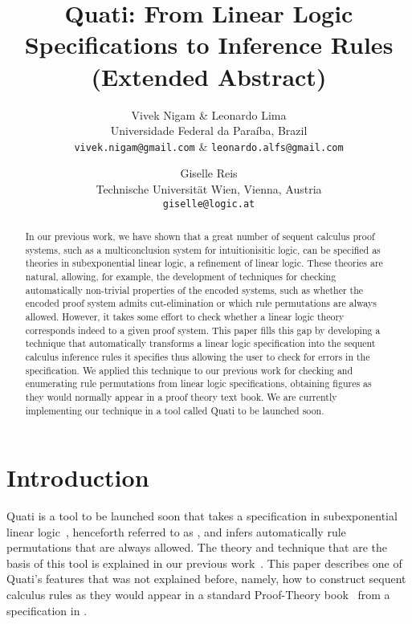 \documentclass[a4paper,10pt]{article}
\title{Quati: From Linear Logic Specifications to Inference Rules (Extended Abstract)}
\author{Vivek Nigam \& Leonardo Lima \\
Universidade Federal da Paraíba, Brazil\\
\texttt{vivek.nigam@gmail.com} \& \texttt{leonardo.alfs@gmail.com} 
\and Giselle Reis\\
Technische Universit\"at Wien, Vienna, Austria\\
\texttt{giselle@logic.at}}
\begin{document}
\maketitle

\begin{abstract}
In our previous work, we have shown that a great number of sequent calculus proof systems, such 
as a multiconclusion system for intuitionisitic logic, can 
be specified as theories in subexponential linear logic, a refinement of linear logic. 
These theories are natural, allowing, for example, the development of techniques for checking
automatically non-trivial properties of the encoded systems, such as whether the encoded proof system 
admits cut-elimination or which rule permutations are always allowed. 
However, it takes some effort to check whether a linear logic theory corresponds
indeed to a given proof system. This paper fills this gap by developing a technique that automatically 
transforms a linear logic specification into the sequent calculus inference rules it specifies thus allowing
the user to check for errors in the specification. We applied this technique to our previous work for 
checking and enumerating rule permutations from linear logic specifications, obtaining figures
as they would normally appear in a proof theory text book. We are currently implementing our technique 
in a tool called Quati to be launched soon.
\end{abstract}

\section{Introduction}
Quati is a tool to be launched soon that takes a specification in subexponential
linear logic~\cite{nigam09ppdp}, henceforth referred to as \sell, and infers
automatically rule permutations that are always allowed. The theory and
technique that are the basis of this tool is explained in our previous
work~\cite{nigam13iclp}. This paper describes one of Quati's features that was
not explained before, namely, how to construct sequent calculus rules as they
would appear in a standard Proof-Theory book~\cite{troelstra96bpt} from a
specification in \sell.
\end{document}
